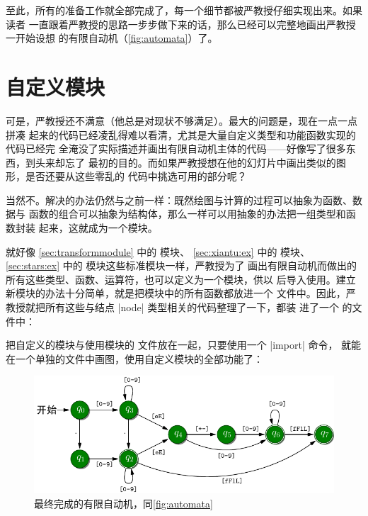 至此，所有的准备工作就全部完成了，每一个细节都被严教授仔细实现出来。如果读者
一直跟着严教授的思路一步步做下来的话，那么已经可以完整地画出严教授一开始设想
的有限自动机（\autoref{fig:automata}）了。


\section{自定义模块}

可是，严教授还不满意（他总是对现状不够满足）。最大的问题是，现在一点一点拼凑
起来的代码已经凌乱得难以看清，尤其是大量自定义类型和功能函数实现的代码已经完
全淹没了实际描述并画出有限自动机主体的代码——好像写了很多东西，到头来却忘了
最初的目的。而如果严教授想在他的幻灯片中画出类似的图形，是否还要从这些零乱的
代码中挑选可用的部分呢？

当然不。解决的办法仍然与之前一样：既然绘图与计算的过程可以抽象为函数、数据与
函数的组合可以抽象为结构体，那么一样可以用抽象的办法把一组类型和函数封装
起来，这就成为一个模块。

就好像 \autoref{sec:transformmodule} 中的  模块、
\autoref{sec:xiantu:ex} 中的  模块、
\autoref{sec:stars:ex} 中的  模块这些标准模块一样，严教授为了
画出有限自动机而做出的所有这些类型、函数、运算符，也可以定义为一个模块，供以
后导入使用。建立新模块的办法十分简单，就是把模块中的所有函数都放进一个 \Asy{}
文件中。因此，严教授就把所有这些与结点 |node| 类型相关的代码整理了一下，都装
进了一个 的文件中：


把自定义的模块与使用模块的 \Asy{} 文件放在一起，只要使用一个 |import| 命令，
就能在一个单独的文件中画图，使用自定义模块的全部功能了：


\begin{figure}[htpb]
  \centering
  \includegraphics{automata.pdf}
  \caption{最终完成的有限自动机，同\autoref{fig:automata}}
  \label{fig:automatafinal}
\end{figure}

